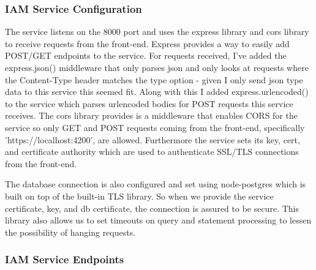 \documentclass[12pt]{article}
\begin{document}
\subsubsection{IAM Service Configuration}
The service listens on the 8000 port and uses the express library and cors library to receive requests from the front-end. Express provides a way to easily add POST/GET endpoints to the service. For requests received, I've added the express.json() middleware that only parses json and only looks at requests where the Content-Type header matches the type option - given I only send json type data to this service this seemed fit. Along with this I added express.urlencoded() to the service which parses urlencoded bodies for POST requests this service receives. The cors library provides is a middleware that enables CORS for the service so only GET and POST requests coming from the front-end, specifically 'https://localhost:4200', are allowed. Furthermore the service sets its key, cert, and certificate authority which are used to authenticate SSL/TLS connections from the front-end.

The database connection is also configured and set using node-postgres which is built on top of the built-in TLS library. So when we provide the service certificate, key, and db certificate, the connection is assured to be secure. This library also allows us to set timeouts on query and statement processing to lessen the possibility of hanging requests.


\subsubsection{IAM Service Endpoints}
\end{document}
